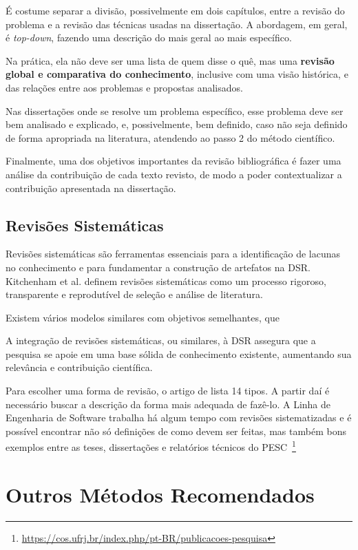 É costume separar a divisão, possivelmente em dois capítulos, entre a revisão do problema e a revisão das técnicas usadas na dissertação. A abordagem, em geral, é \textit{top-down}, fazendo uma descrição do mais geral ao mais específico.

Na prática, ela não deve ser uma lista de quem disse o quê, mas uma \textbf{revisão global e comparativa do conhecimento}, inclusive com uma visão histórica, e das relações entre aos problemas e propostas analisados.

Nas dissertações onde se resolve um problema específico, esse problema deve ser bem analisado e explicado, e, possivelmente, bem definido, caso não seja definido de forma apropriada na literatura, atendendo ao passo 2 do método científico. 

Finalmente, uma dos objetivos importantes da revisão bibliográfica é fazer uma análise da contribuição de cada texto revisto, de modo a poder contextualizar a contribuição apresentada na dissertação.


\subsection{Revisões Sistemáticas}

Revisões sistemáticas são ferramentas essenciais para a identificação de lacunas no conhecimento e para fundamentar a construção de artefatos na DSR. Kitchenham et al. \cite{kitchenham2004procedures} definem revisões sistemáticas como um processo rigoroso, transparente e reprodutível de seleção e análise de literatura.

Existem vários modelos similares com objetivos semelhantes, que 

A integração de revisões sistemáticas, ou similares, à DSR assegura que a pesquisa se apoie em uma base sólida de conhecimento existente, aumentando sua relevância e contribuição científica.

Para escolher uma forma de revisão, o artigo de \citet{grant2009typology} lista 14 tipos. A partir daí é necessário buscar a descrição da forma mais adequada de fazê-lo. A Linha de Engenharia de Software trabalha há algum tempo com revisões sistematizadas e é possível encontrar não só definições de como devem ser feitas, mas também bons exemplos entre as teses, dissertações e relatórios técnicos do PESC~\footnote{\url{https://cos.ufrj.br/index.php/pt-BR/publicacoes-pesquisa}}


\section{Outros Métodos Recomendados}


